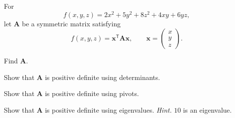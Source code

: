 \begin{problem}
For
\[
f(x,y,z)=2x^2+5y^2+8z^2+4xy+6yz,
\]
let $\mathbf A$ be a symmetric matrix satisfying
\[
f(x,y,z)=\mathbf x^{\mathsf T}\mathbf A\mathbf x,
\qquad
\mathbf x=
\begin{pmatrix}
x\\y\\z
\end{pmatrix}.
\]
\begin{problemsubparts}
\item Find $\mathbf A$.
\item Show that $\mathbf A$ is positive definite using determinants.
\item Show that $\mathbf A$ is positive definite using pivots.
\item Show that $\mathbf A$ is positive definite using eigenvalues. \textit{Hint.} $10$ is an eigenvalue.
\end{problemsubparts}
\end{problem}


